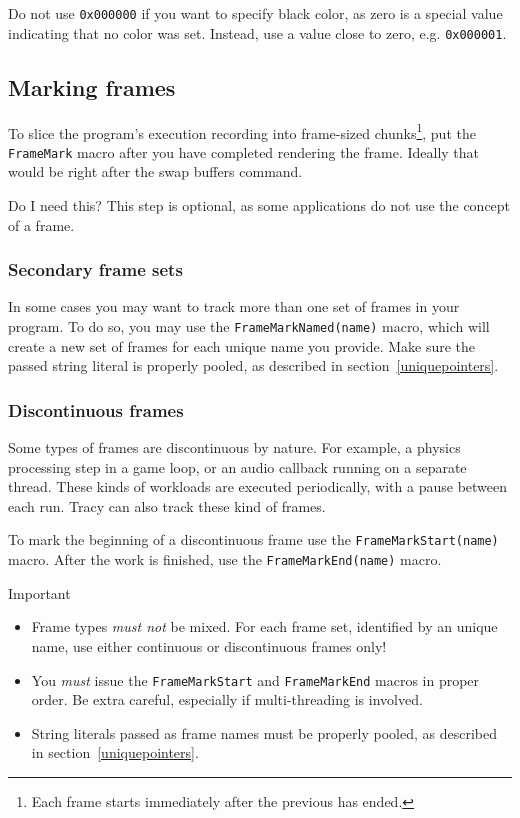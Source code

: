 \documentclass[hidelinks,titlepage,a4paper]{article}
\begin{document}
Do not use \texttt{0x000000} if you want to specify black color, as zero is a special value indicating that no color was set. Instead, use a value close to zero, e.g. \texttt{0x000001}.

\subsection{Marking frames}
\label{markingframes}

To slice the program's execution recording into frame-sized chunks\footnote{Each frame starts immediately after the previous has ended.}, put the \texttt{FrameMark} macro after you have completed rendering the frame. Ideally that would be right after the swap buffers command.

\begin{bclogo}[
noborder=true,
couleur=black!5,
logo=\bclampe
]{Do I need this?}
This step is optional, as some applications do not use the concept of a frame.
\end{bclogo}

\subsubsection{Secondary frame sets}
\label{secondaryframeset}

In some cases you may want to track more than one set of frames in your program. To do so, you may use the \texttt{FrameMarkNamed(name)} macro, which will create a new set of frames for each unique name you provide. Make sure the passed string literal is properly pooled, as described in section~\ref{uniquepointers}.

\subsubsection{Discontinuous frames}

Some types of frames are discontinuous by nature. For example, a physics processing step in a game loop, or an audio callback running on a separate thread. These kinds of workloads are executed periodically, with a pause between each run. Tracy can also track these kind of frames.

To mark the beginning of a discontinuous frame use the \texttt{FrameMarkStart(name)} macro. After the work is finished, use the \texttt{FrameMarkEnd(name)} macro.

\begin{bclogo}[
noborder=true,
couleur=black!5,
logo=\bcbombe
]{Important}
\begin{itemize}
\item Frame types \emph{must not} be mixed. For each frame set, identified by an unique name, use either continuous or discontinuous frames only!
\item You \emph{must} issue the \texttt{FrameMarkStart} and \texttt{FrameMarkEnd} macros in proper order. Be extra careful, especially if multi-threading is involved.
\item String literals passed as frame names must be properly pooled, as described in section~\ref{uniquepointers}.
\end{itemize}
\end{bclogo}
\end{document}
